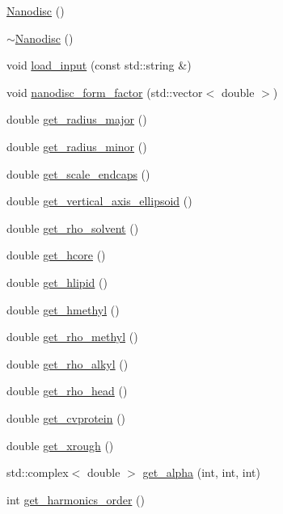 \begin{DoxyCompactItemize}
\item 
\mbox{\hyperlink{class_nanodisc_aa00e9eab42513fd080d8158eaae583bc}{Nanodisc}} ()
\item 
\mbox{\hyperlink{class_nanodisc_a886aab21eceaf2faf04728ba3d965614}{$\sim$\+Nanodisc}} ()
\item 
void \mbox{\hyperlink{class_nanodisc_ad515e40b045311510b0bb99383e67443}{load\+\_\+input}} (const std\+::string \&)
\item 
void \mbox{\hyperlink{class_nanodisc_ab768b3dc4974ac2c6fc820d848f1698f}{nanodisc\+\_\+form\+\_\+factor}} (std\+::vector$<$ double $>$)
\item 
double \mbox{\hyperlink{class_nanodisc_a63dd4a835a10d9e1e2f0e8a44f4976cb}{get\+\_\+radius\+\_\+major}} ()
\item 
double \mbox{\hyperlink{class_nanodisc_ab7687bac66c2de3f72c11d1b1f1f9f49}{get\+\_\+radius\+\_\+minor}} ()
\item 
double \mbox{\hyperlink{class_nanodisc_ac6f2cccbdec425c9a4fc59d11393bcd1}{get\+\_\+scale\+\_\+endcaps}} ()
\item 
double \mbox{\hyperlink{class_nanodisc_ad395bb670a6d45f4579f57a7ff1ee93f}{get\+\_\+vertical\+\_\+axis\+\_\+ellipsoid}} ()
\item 
double \mbox{\hyperlink{class_nanodisc_a03753ced50590244f40bf39658437308}{get\+\_\+rho\+\_\+solvent}} ()
\item 
double \mbox{\hyperlink{class_nanodisc_ad16b4f61aa880a7e1b48bbde08fdeec9}{get\+\_\+hcore}} ()
\item 
double \mbox{\hyperlink{class_nanodisc_a7f8ff2d00e921210a591d3488f16db84}{get\+\_\+hlipid}} ()
\item 
double \mbox{\hyperlink{class_nanodisc_a2f2d5f1546800821bcd957e0c96bfea2}{get\+\_\+hmethyl}} ()
\item 
double \mbox{\hyperlink{class_nanodisc_ae80f727607e9a220c1a31b830f42225e}{get\+\_\+rho\+\_\+methyl}} ()
\item 
double \mbox{\hyperlink{class_nanodisc_a727085dba7e6269e0d17de14187d4ae2}{get\+\_\+rho\+\_\+alkyl}} ()
\item 
double \mbox{\hyperlink{class_nanodisc_afcdab9b4cf99f623a486391e9fc77898}{get\+\_\+rho\+\_\+head}} ()
\item 
double \mbox{\hyperlink{class_nanodisc_a051d2db01fe011def7065b669ce1958e}{get\+\_\+cvprotein}} ()
\item 
double \mbox{\hyperlink{class_nanodisc_af6c81e273d1d7eaf445bec0542024c9c}{get\+\_\+xrough}} ()
\item 
std\+::complex$<$ double $>$ \mbox{\hyperlink{class_nanodisc_a511f4de3610ae33b9c83e542b98c6441}{get\+\_\+alpha}} (int, int, int)
\item 
int \mbox{\hyperlink{class_nanodisc_a4fe3dd5c723dd714ebecbb575cf842c9}{get\+\_\+harmonics\+\_\+order}} ()
\end{DoxyCompactItemize}


